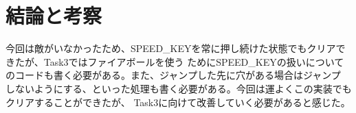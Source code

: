 \documentclass[a4paper,11pt]{jsarticle}
\begin{document}
\section*{結論と考察}
今回は敵がいなかったため、SPEED\_KEYを常に押し続けた状態でもクリアできたが、Task3ではファイアボールを使う
ためにSPEED\_KEYの扱いについてのコードも書く必要がある。また、ジャンプした先に穴がある場合はジャンプ
しないようにする、といった処理も書く必要がある。今回は運よくこの実装でもクリアすることができたが、
Task3に向けて改善していく必要があると感じた。

\printbibliography[title=参考文献]
\end{document}
